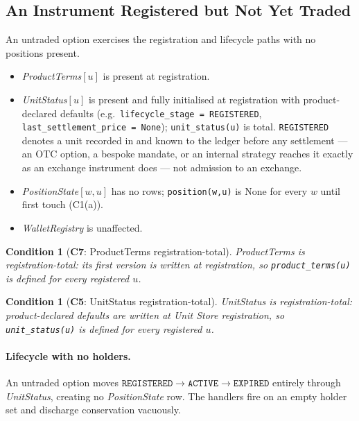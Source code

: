\documentclass[11pt,a4paper]{article}
\newtheorem{condition}[definition]{Condition}
\begin{document}
\subsection{An Instrument Registered but Not Yet Traded}
\label{sec:untraded}

An untraded option exercises the registration and lifecycle paths with no positions present.

\begin{itemize}[leftmargin=*]
\item \emph{ProductTerms}$[u]$ is present at registration.
\item \emph{UnitStatus}$[u]$ is present and fully initialised at registration with
product-declared defaults (e.g.\ \texttt{lifecycle\_stage = REGISTERED},
\texttt{last\_settlement\_price = None}); \texttt{unit\_status(u)} is total.
\texttt{REGISTERED} denotes a unit recorded in and known to the ledger before any
settlement --- an OTC option, a bespoke mandate, or an internal strategy reaches it
exactly as an exchange instrument does --- not admission to an exchange.
\item \emph{PositionState}$[w,u]$ has no rows; \texttt{position(w,u)} is $\mathrm{None}$ for
every $w$ until first touch (C1(a)).
\item \emph{WalletRegistry} is unaffected.
\end{itemize}

\begin{condition}[\textbf{C7}: ProductTerms registration-total]
\emph{ProductTerms} is registration-total: its first version is written at registration, so
\texttt{product\_terms(u)} is defined for every registered $u$.
\end{condition}

\begin{condition}[\textbf{C5}: UnitStatus registration-total]
\emph{UnitStatus} is registration-total: product-declared defaults are written at Unit Store
registration, so \texttt{unit\_status(u)} is defined for every registered $u$.
\end{condition}

\paragraph{Lifecycle with no holders.}
An untraded option moves $\texttt{REGISTERED}\to\texttt{ACTIVE}\to\texttt{EXPIRED}$ entirely
through \emph{UnitStatus}, creating no \emph{PositionState} row. The handlers fire on an
empty holder set and discharge conservation vacuously.
\end{document}
